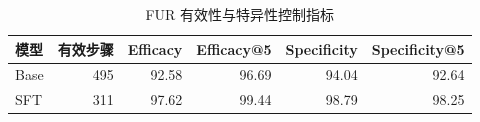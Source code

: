 \begin{table}[H]
\centering
\small
\caption{FUR 有效性与特异性控制指标}
\label{tab:controls}
\begin{tabular}{lrrrrr}
\toprule
模型 & 有效步骤 & Efficacy & Efficacy@5 & Specificity & Specificity@5 \\
\midrule
Base & 495 & 92.58 & 96.69 & 94.04 & 92.64 \\
SFT & 311 & 97.62 & 99.44 & 98.79 & 98.25 \\
\bottomrule
\end{tabular}
\end{table}
